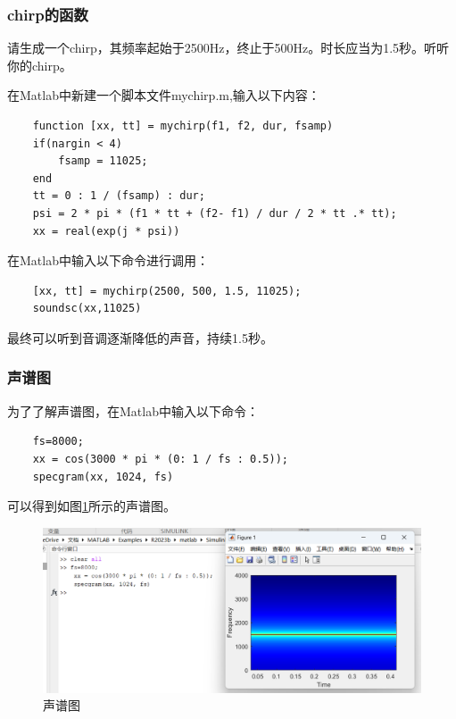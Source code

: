 \documentclass[UTF8]{ctexart}
\begin{document}
\subsubsection{chirp的函数}
\begin{framed}
    请生成一个chirp，其频率起始于2500Hz，终止于500Hz。时长应当为1.5秒。听听你的chirp。
\end{framed}
在Matlab中新建一个脚本文件mychirp.m,输入以下内容：
\begin{verbatim}
    function [xx, tt] = mychirp(f1, f2, dur, fsamp)
    if(nargin < 4)
        fsamp = 11025;
    end
    tt = 0 : 1 / (fsamp) : dur;
    psi = 2 * pi * (f1 * tt + (f2- f1) / dur / 2 * tt .* tt);
    xx = real(exp(j * psi))
\end{verbatim}
在Matlab中输入以下命令进行调用：
\begin{verbatim}
    [xx, tt] = mychirp(2500, 500, 1.5, 11025);
    soundsc(xx,11025)
\end{verbatim}
最终可以听到音调逐渐降低的声音，持续1.5秒。

\subsubsection{声谱图}
为了了解声谱图，在Matlab中输入以下命令：
\begin{verbatim}
    fs=8000;
    xx = cos(3000 * pi * (0: 1 / fs : 0.5));
    specgram(xx, 1024, fs)
\end{verbatim}
可以得到如图\ref{img:sonagraph}所示的声谱图。
\begin{figure}[htbp]
    \centering
    \includegraphics[width=0.7\linewidth]{sonagraph.png}
    \caption{声谱图}
    \label{img:sonagraph}
\end{figure}
\end{document}
